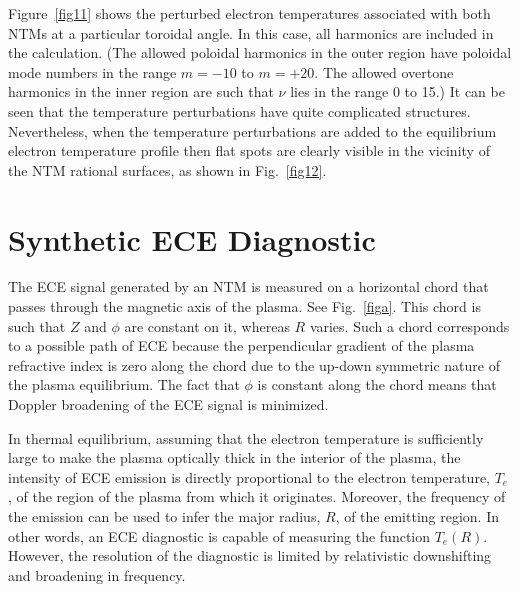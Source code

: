 \documentclass[12pt,prb,aps]{revtex4-1}
\begin{document}
Figure~\ref{fig11} shows
the perturbed electron temperatures associated with both NTMs at a particular toroidal angle. In this case, all harmonics are included in the calculation. (The allowed poloidal harmonics in the
outer region have poloidal mode numbers in the range $m=-10$ to $m=+20$. The allowed overtone harmonics in the inner region are such that
$\nu$ lies in the range $0$ to 15.) It can be seen that the temperature perturbations have quite complicated structures. Nevertheless, when the temperature perturbations are
added to the equilibrium electron temperature profile then flat spots are clearly visible in the vicinity of the NTM rational surfaces, as shown in Fig.~\ref{fig12}. 

\section{Synthetic ECE Diagnostic}\label{s6}
The ECE signal generated by an NTM is  measured on a horizontal chord that passes through the magnetic axis of the plasma. See Fig.~\ref{figa}. This chord
is such that $Z$ and $\phi$ are constant on it, whereas $R$ varies. Such a chord corresponds to a possible  path of ECE because 
the perpendicular gradient of the plasma refractive index is zero along the chord due to the up-down symmetric nature of the plasma equilibrium. The fact that $\phi$
is constant along the chord means that Doppler
broadening of the ECE signal is minimized.\cite{ece4a,ece5} 

In thermal equilibrium, assuming that the electron temperature is sufficiently large to make the plasma optically thick in the interior of the plasma, the intensity of ECE emission is directly proportional to the electron temperature, $T_e$,  of the region of the plasma from which it originates.\cite{ece1,ece2} Moreover, the frequency of the emission can be used to infer the major radius, $R$,  of the
emitting region. In other words, an ECE diagnostic is capable of measuring the function $T_e(R)$. However, the resolution of the diagnostic is limited by relativistic downshifting and 
broadening in frequency.   
\end{document}
